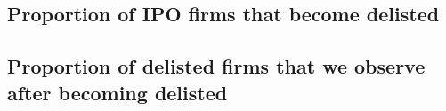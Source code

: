 \documentclass[12pt,notitlepage]{article}
\begin{document}
\subsection{Proportion of IPO firms that become delisted}

\begin{table}[!htpb]
    \centering
    \caption{Italy}
    \label{tab:my_label}
\end{table}

\begin{table}[!htpb]
    \centering
    \caption{France}
    \label{tab:my_label}
\end{table}

\begin{table}[!htpb]
    \centering
    \caption{Hungary}
    \label{tab:my_label}
\end{table}

\begin{table}[!htpb]
    \centering
    \caption{Czech Republic}
    \label{tab:my_label}
\end{table}
\pagebreak


\subsection{Proportion of delisted firms that we observe after becoming delisted}

\begin{table}[!htpb]
    \centering
    \caption{Italy}
    \label{tab:my_label}
\end{table}
\end{document}
